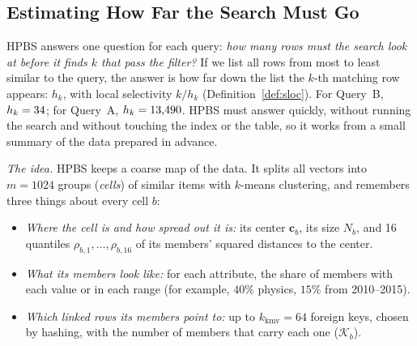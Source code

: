 \documentclass[sigconf,nonacm]{acmart}
\begin{document}
\subsection{Estimating How Far the Search Must Go}\label{sec:sketch}
HPBS answers one question for each query: \emph{how many rows must the search look at before it finds $k$ that pass the filter?} If we list all rows from most to least similar to the query, the answer is how far down the list the $k$-th matching row appears: $h_k$, with local selectivity $k/h_k$ (Definition~\ref{def:sloc}). For Query~B, $h_k=34$; for Query~A, $h_k=13{,}490$. HPBS must answer quickly, without running the search and without touching the index or the table, so it works from a small summary of the data prepared in advance.

\emph{The idea.} HPBS keeps a coarse map of the data. It splits all vectors into $m=1024$ groups (\emph{cells}) of similar items with $k$-means clustering, and remembers three things about every cell $b$:
\begin{itemize}
  \item \emph{Where the cell is and how spread out it is:} its center $\mathbf{c}_b$, its size $N_b$, and 16 quantiles $\rho_{b,1},\ldots,\rho_{b,16}$ of its members' squared distances to the center.
  \item \emph{What its members look like:} for each attribute, the share of members with each value or in each range (for example, $40\%$ physics, $15\%$ from 2010--2015).
  \item \emph{Which linked rows its members point to:} up to $k_{\text{kmv}}=64$ foreign keys, chosen by hashing, with the number of members that carry each one ($\mathcal{K}_b$).
\end{itemize}
\end{document}
